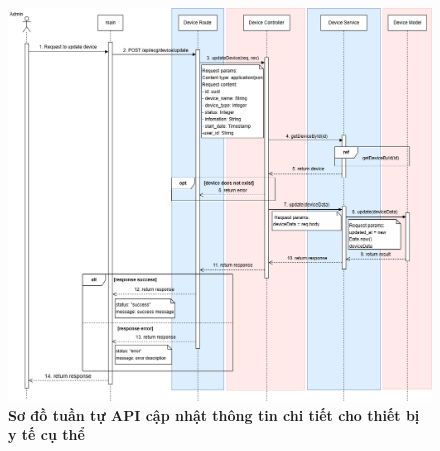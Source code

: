 \begin{figure}[H]
	\centering
	\includegraphics[width=16cm]{Images/api_sequence/device/device-updateDevice.drawio.png}
	\caption[Sơ đồ tuần tự API cập nhật thông tin chi tiết cho thiết bị y tế cụ thể]{\bfseries \fontsize{12pt}{0pt}\selectfont Sơ đồ tuần tự API cập nhật thông tin chi tiết cho thiết bị y tế cụ thể}
	\label{sequence_diagram_update_device}
\end{figure}

